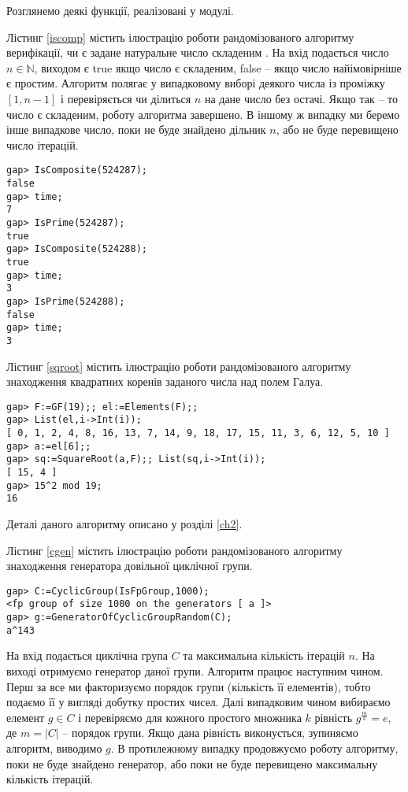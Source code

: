 Розглянемо деякі функції, реалізовані у модулі.

Лістинг \ref{iscomp} містить ілюстрацію роботи рандомізованого алгоритму верифікації, чи є задане натуральне число складеним \cite{SolStr77}. На вхід подається число $n \in \mathbb{N}$, виходом є true якщо число є складеним, false -- якщо число найімовірніше є простим. Алгоритм полягає у випадковому виборі деякого числа із проміжку  $[1, n-1]$ і перевіряється чи ділиться $n$ на дане число без остачі. Якщо так -- то число є складеним, роботу алгоритма завершено. В іншому ж випадку ми беремо інше випадкове число, поки не буде знайдено дільник $n$, або не буде перевищено число ітерацій.

\begin{lstlisting}[label=iscomp,caption=Функція IsComposite]
gap> IsComposite(524287);
false
gap> time;
7
gap> IsPrime(524287);    
true
gap> IsComposite(524288);
true
gap> time;               
3
gap> IsPrime(524288);    
false
gap> time;           
3
\end{lstlisting}

Лістинг \ref{sqroot} містить ілюстрацію роботи рандомізованого алгоритму знаходження квадратних коренів заданого числа над полем Галуа.
\begin{lstlisting}[label=sqroot,caption=Функція SquareRoot]
gap> F:=GF(19);; el:=Elements(F);;
gap> List(el,i->Int(i));
[ 0, 1, 2, 4, 8, 16, 13, 7, 14, 9, 18, 17, 15, 11, 3, 6, 12, 5, 10 ]
gap> a:=el[6];;                               
gap> sq:=SquareRoot(a,F);; List(sq,i->Int(i));
[ 15, 4 ]
gap> 15^2 mod 19;
16
\end{lstlisting}

Деталі даного алгоритму описано у розділі \ref{ch2}.

Лістинг \ref{cgen} містить ілюстрацію роботи рандомізованого алгоритму знаходження генератора довільної циклічної групи.
\begin{lstlisting}[label=cgen,caption=Функція GeneratorOfCyclicGroupRandom]
gap> C:=CyclicGroup(IsFpGroup,1000);
<fp group of size 1000 on the generators [ a ]>
gap> g:=GeneratorOfCyclicGroupRandom(C);
a^143
\end{lstlisting}

На вхід подається циклічна група $C$ та максимальна кількість ітерацій $n$. На виході отримуємо генератор даної групи. Алгоритм працює наступним чином. Перш за все ми факторизуємо порядок групи (кількість її елементів), тобто подаємо її у вигляді добутку простих чисел. Далі випадковим чином вибираємо елемент $g \in C$ і перевіряємо для кожного простого множника $k$ рівність $g^{\frac{m}{k}}=e$, де  $m =  |C|$ -- порядок групи. Якщо дана рівність виконується, зупиняємо алгоритм, виводимо $g$. В протилежному випадку продовжуємо роботу алгоритму, поки не буде знайдено генератор, або поки не буде перевищено максимальну кількість ітерацій.

